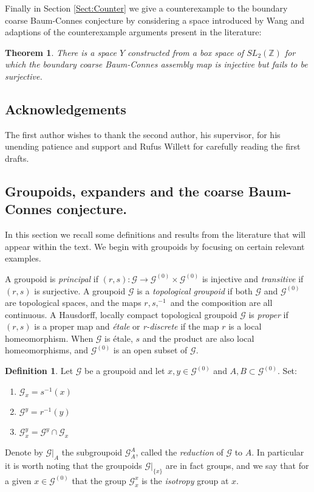 \documentclass[11pt]{amsart}
\theoremstyle{plain}
\newtheorem*{thm}{Theorem}
\theoremstyle{definition}%
\newtheorem{definition}[theorem]{Definition}%
\theoremstyle{remark}%
\newcommand{\G}{\mathcal{G}}
\begin{document}
Finally in Section \ref{Sect:Counter} we give a counterexample to the boundary coarse Baum-Connes conjecture by considering a space introduced by Wang \cite{MR2363697} and adaptions of the counterexample arguments present in the literature:

\begin{thm}
There is a space $Y$ constructed from a box space of $SL_{2}(\mathbb{Z})$ for which the boundary coarse Baum-Connes assembly map is injective but fails to be surjective.
\end{thm}

\subsection{Acknowledgements}
The first author wishes to thank the second author, his supervisor, for his unending patience and support and Rufus Willett for carefully reading the first drafts.

\subsection{Groupoids, expanders and the coarse Baum-Connes conjecture.}\label{Sect:GO}
In this section we recall some definitions and results from the literature that will appear within the text. We begin with groupoids by focusing on certain relevant examples.

A groupoid is \textit{principal} if $(r,s): \G \rightarrow \G^{(0)} \times \G^{(0)}$ is injective and \textit{transitive} if $(r,s)$ is surjective. A groupoid $\G$ is a \textit{topological groupoid} if both $\G$ and $\G^{(0)}$ are topological spaces, and the maps $r,s, ^{-1}$ and the composition are all continuous. A Hausdorff, locally compact topological groupoid $\G$ is \textit{proper} if $(r,s)$ is a proper map and \textit{\'etale} or \textit{r-discrete} if the map $r$ is a local homeomorphism. When $\G$ is \'etale, $s$ and the product are also local homeomorphisms, and $\G^{(0)}$ is an open subset of $\G$.

\begin{definition}
Let $\G$ be a groupoid and let $x,y \in \G^{(0)}$ and $A,B \subset \G^{(0)}$. Set:
\begin{enumerate}
\item $\G_{x}=s^{-1}(x)$
\item $\G^{y}=r^{-1}(y)$
\item $\G^{y}_{x}=\G^{y} \cap \G_{x}$
\end{enumerate}
Denote by $\G|_{A}$ the subgroupoid $\G_{A}^{A}$, called the \textit{reduction} of $\G$ to $A$. In particular it is worth noting that the groupoids $\G|_{\lbrace x \rbrace}$ are in fact groups, and we say that for a given $x \in \G^{(0)}$ that the group $\G^{x}_{x}$ is the \textit{isotropy} group at $x$.
\end{definition}
\end{document}
